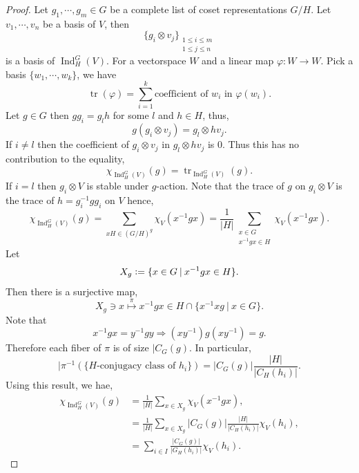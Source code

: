 \documentclass{article}
\numberwithin{equation}{theorem}
\DeclareMathOperator{\tr}{tr}
\DeclareMathOperator{\Ind}{Ind}
\newcommand{\defeq}{\vcentcolon=}
\newcommand{\sep}[0]{\:|\:}
\begin{document}
\begin{proof}
    Let $g_1,\cdots,g_m\in G$ be a complete list of coset representations $G/H$. Let $v_1,\cdots,v_n$ be a basis of $V$, then 
    \begin{equation*}
        \{g_i\otimes v_j\}_{\substack{1\leq i\leq m\\1\leq j\leq n}}
    \end{equation*}
    is a basis of $\Ind_H^G(V)$. For a vectorspace $W$ and a linear map $\varphi:W\to W$. Pick a basis $\{w_1,\cdots,w_k\}$, we have
    \begin{equation*}
        \tr(\varphi) = \sum_{i=1}^k \text{coefficient of $w_i$ in }\varphi(w_i).
    \end{equation*}
    Let $g\in G$ then $gg_i = g_lh$ for some $l$ and $h\in H$, thus,
    \begin{equation*}
        g(g_i\otimes v_j) = g_l\otimes hv_j.
    \end{equation*}
    If $i\not=l$ then the coefficient of $g_i\otimes v_j$ in $g_l\otimes hv_j$ is $0$. Thus this has no contribution to the equality,
    \begin{equation*}
        \chi_{\Ind_H^G(V)}(g) = \tr_{\Ind_H^G(V)}(g).
    \end{equation*}
    If $i=l$ then $g_i\otimes V$ is stable under $g$-action. Note that the trace of $g$ on $g_i\otimes V$ is the trace of $h=g^{-1}_igg_i$ on $V$ hence,
    \begin{equation*}
        \chi_{\Ind_H^G(V)}(g) = \sum_{xH\in (G/H)^g}\chi_V(x^{-1}gx) = {\frac 1 {\vert H\vert}}\sum_{\substack{x\in G\\ x^{-1}gx\in H}}\chi_V(x^{-1}gx).
    \end{equation*}
    Let 
    \begin{equation*}
        X_g\defeq \{x\in G\sep x^{-1}gx\in H\}.
    \end{equation*}
    Then there is a surjective map,
    \begin{equation*}
        X_g\ni x\stackrel{\pi}{\longmapsto}x^{-1}gx\in H\cap \{x^{-1}xg\sep x\in G\}.
    \end{equation*}
    Note that 
    \begin{equation*}
        x^{-1}gx=y^{-1}gy\Rightarrow (xy^{-1})g(xy^{-1}) = g.
    \end{equation*}
    Therefore each fiber of $\pi$ is of size $\vert C_G(g)$. In particular,
    \begin{equation*}
        \vert \pi^{-1}(\{\text{$H$-conjugacy class of $h_i$}\}) = \vert C_G(g)\vert {\frac {\vert H\vert}{\vert C_H(h_i)\vert}}.
    \end{equation*}
    Using this result, we hae,
    \begin{align*}
        \chi_{\Ind_H^G(V)}(g) & = {\frac 1 {\vert H\vert}}\sum_{x\in X_g}\chi_V(x^{-1}gx),\\
        & = {\frac 1 {\vert H\vert}}\sum_{x\in X_g}\vert C_G(g)\vert {\frac {\vert H\vert} {\vert C_H(h_i)\vert}}\chi_V(h_i),\\
        & = \sum_{i\in I}{\frac {\vert C_G(g)\vert} {\vert G_H(h_i)\vert}}\chi_V(h_i).
    \end{align*}
\end{proof}
\end{document}
